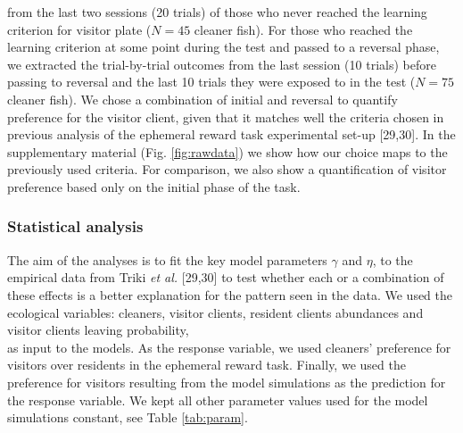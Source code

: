 \documentclass[10pt,letterpaper]{article}
\begin{document}
from the last two sessions (20 trials) of those who never reached the
learning criterion for visitor plate (\(N = 45\) cleaner fish). For
those who reached the learning criterion at some point during the test
and passed to a reversal phase, we extracted the trial-by-trial outcomes
from the last session (10 trials) before passing to reversal and the
last 10 trials they were exposed to in the test (\(N = 75\) cleaner
fish). We chose a combination of initial and reversal to quantify
preference for the visitor client, given that it matches well the
criteria chosen in previous analysis of the ephemeral reward task
experimental set-up {[}29,30{]}. In the supplementary material (Fig.
\ref{fig:rawdata}) we show how our choice maps to the previously used
criteria. For comparison, we also show a quantification of visitor
preference based only on the initial phase of the task.

\hypertarget{statistical-analysis}{%
\subsubsection{Statistical analysis}\label{statistical-analysis}}

The aim of the analyses is to fit the key model parameters \(\gamma\)
and \(\eta\), to the empirical data from Triki \emph{et al.} {[}29,30{]}
to test whether each or a combination of these effects is a better
explanation for the pattern seen in the data. We used the ecological
variables: cleaners, visitor clients, resident clients abundances and
visitor clients leaving probability,\\
as input to the models. As the response variable, we used cleaners'
preference for visitors over residents in the ephemeral reward task.
Finally, we used the preference for visitors resulting from the model
simulations as the prediction for the response variable. We kept all
other parameter values used for the model simulations constant, see
Table \ref{tab:param}.
\end{document}
